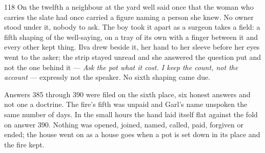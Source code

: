 \begin{CRchronicle}{118}
On the twelfth a neighbour at the yard well said once that the woman who carries the slate had once carried a figure naming a person she knew. No owner stood under it, nobody to ask. The boy took it apart as a surgeon takes a field: a fifth shaping of the well-saying, on a tray of its own with a finger between it and every other kept thing. Ilva drew beside it, her hand to her sleeve before her eyes went to the asker; the strip stayed unread and she answered the question put and not the one behind it — \emph{Ask the pot what it cost. I keep the count, not the account} — expressly not the speaker. No sixth shaping came due.

Answers 385 through 390 were filed on the sixth place, six honest answers and not one a doctrine. The fire’s fifth was unpaid and Garl’s name unspoken the same number of days. In the small hours the hand laid itself flat against the fold on answer 390. Nothing was opened, joined, named, called, paid, forgiven or ended; the house went on as a house goes when a pot is set down in its place and the fire kept.
\end{CRchronicle}
